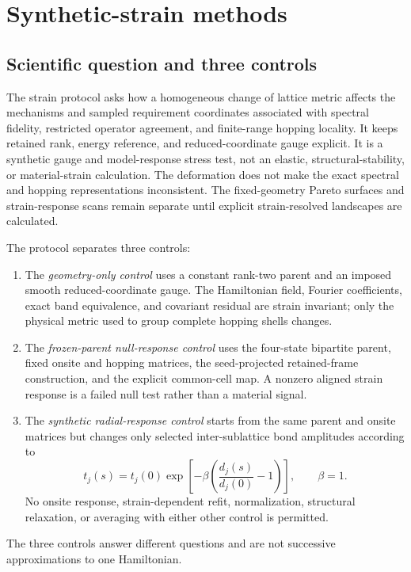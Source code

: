 \documentclass[11pt]{article}
\begin{document}
\section{Synthetic-strain methods}
\label{sec:strain-protocol}

\subsection{Scientific question and three controls}

The strain protocol asks how a homogeneous change of lattice metric affects the
mechanisms and sampled requirement coordinates associated with spectral fidelity,
restricted operator agreement, and finite-range hopping locality. It keeps retained
rank, energy reference, and reduced-coordinate gauge explicit. It is a synthetic gauge
and model-response stress test, not an elastic, structural-stability, or material-strain
calculation. The deformation does not make the exact spectral and hopping
representations inconsistent. The fixed-geometry Pareto surfaces and strain-response
scans remain separate until explicit strain-resolved landscapes are calculated.

The protocol separates three controls:
\begin{enumerate}
 \item The \emph{geometry-only control} uses a constant rank-two parent and an imposed
 smooth reduced-coordinate gauge. The Hamiltonian field, Fourier coefficients, exact
 band equivalence, and covariant residual are strain invariant; only the physical metric
 used to group complete hopping shells changes.
 \item The \emph{frozen-parent null-response control} uses the four-state
 bipartite parent, fixed onsite and hopping matrices, the seed-projected retained-frame
 construction, and the explicit common-cell map. A nonzero aligned strain response is a
 failed null test rather than a material signal.
 \item The \emph{synthetic radial-response control} starts from the same parent and
 onsite matrices but changes only selected inter-sublattice bond amplitudes according to
 \begin{equation}
  t_j(s)=t_j(0)\exp\!\left[-\beta
  \left(\frac{d_j(s)}{d_j(0)}-1\right)\right],
  \qquad \beta=1.
  \label{eq:strain-radial-response-law}
 \end{equation}
 No onsite response, strain-dependent refit, normalization, structural relaxation, or
 averaging with either other control is permitted.
\end{enumerate}
The three controls answer different questions and are not successive approximations to
one Hamiltonian.
\end{document}
